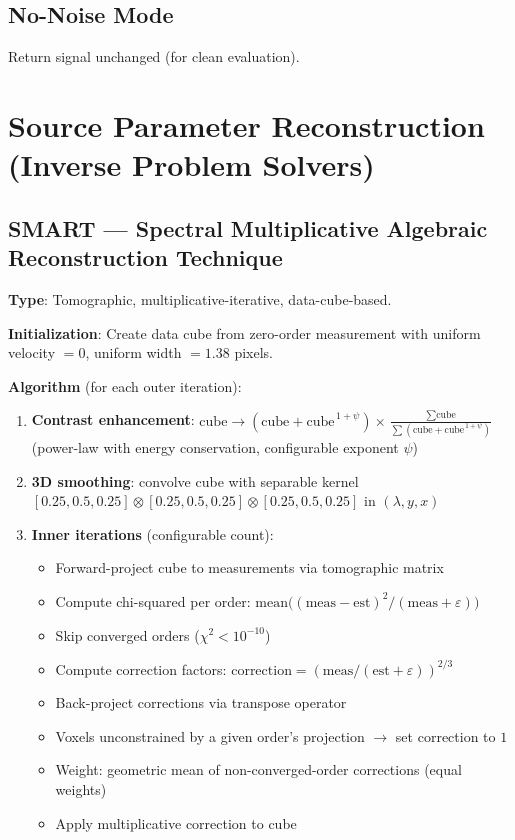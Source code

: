 \documentclass[11pt,a4paper]{article}
\begin{document}
\subsection{No-Noise Mode}
Return signal unchanged (for clean evaluation).

\section{Source Parameter Reconstruction (Inverse Problem Solvers)}

\subsection{SMART --- Spectral Multiplicative Algebraic Reconstruction Technique}
\textbf{Type}: Tomographic, multiplicative-iterative, data-cube-based.

\smallskip
\textbf{Initialization}: Create data cube from zero-order measurement with uniform velocity $=0$, uniform width $=1.38$ pixels.

\smallskip
\textbf{Algorithm} (for each outer iteration):
\begin{enumerate}[nosep]
  \item \textbf{Contrast enhancement}: $\text{cube} \rightarrow (\text{cube} + \text{cube}^{\,1+\psi}) \times \frac{\sum\text{cube}}{\sum(\text{cube} + \text{cube}^{\,1+\psi})}$ (power-law with energy conservation, configurable exponent $\psi$)
  \item \textbf{3D smoothing}: convolve cube with separable kernel $[0.25, 0.5, 0.25] \otimes [0.25, 0.5, 0.25] \otimes [0.25, 0.5, 0.25]$ in $(\lambda, y, x)$
  \item \textbf{Inner iterations} (configurable count):
  \begin{itemize}[nosep]
    \item Forward-project cube to measurements via tomographic matrix
    \item Compute chi-squared per order: $\text{mean}\big((\text{meas} - \text{est})^2 / (\text{meas} + \varepsilon)\big)$
    \item Skip converged orders ($\chi^2 < 10^{-10}$)
    \item Compute correction factors: $\text{correction} = (\text{meas} / (\text{est} + \varepsilon))^{2/3}$
    \item Back-project corrections via transpose operator
    \item Voxels unconstrained by a given order's projection $\rightarrow$ set correction to $1$
    \item Weight: geometric mean of non-converged-order corrections (equal weights)
    \item Apply multiplicative correction to cube
  \end{itemize}
\end{enumerate}
\end{document}
